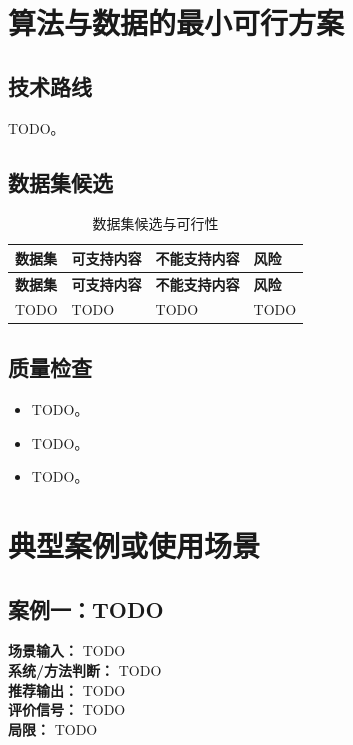 \documentclass[UTF8,a4paper,11pt]{ctexart}
\begin{document}
\section{算法与数据的最小可行方案}

\subsection{技术路线}

TODO。

\subsection{数据集候选}

\begin{longtable}{p{3cm}p{4cm}p{4cm}p{3cm}}
\caption{数据集候选与可行性} \\
\toprule
\textbf{数据集} & \textbf{可支持内容} & \textbf{不能支持内容} & \textbf{风险} \\
\midrule
\endfirsthead
\toprule
\textbf{数据集} & \textbf{可支持内容} & \textbf{不能支持内容} & \textbf{风险} \\
\midrule
\endhead
TODO & TODO & TODO & TODO \\
\bottomrule
\end{longtable}

\subsection{质量检查}

\begin{itemize}[leftmargin=2em]
  \item TODO。
  \item TODO。
  \item TODO。
\end{itemize}

\section{典型案例或使用场景}

\subsection{案例一：TODO}

\begin{tcolorbox}[mybox,title=Demo Case 1]
\textbf{场景输入：} TODO\\[0.3em]
\textbf{系统/方法判断：} TODO\\[0.3em]
\textbf{推荐输出：} TODO\\[0.3em]
\textbf{评价信号：} TODO\\[0.3em]
\textbf{局限：} TODO
\end{tcolorbox}
\end{document}
